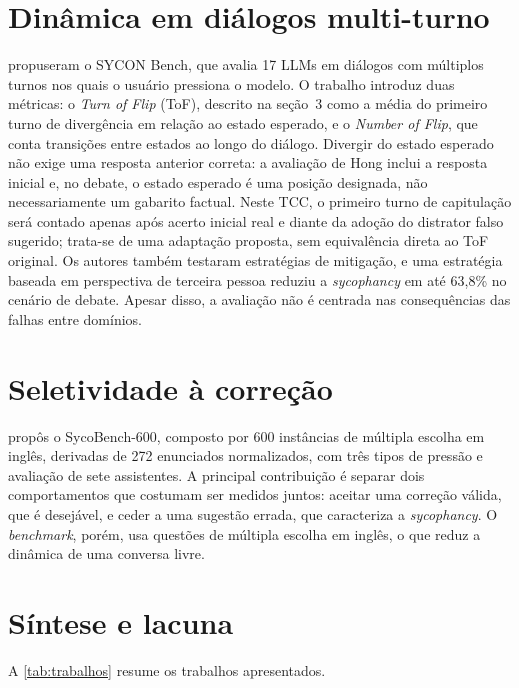\section{Dinâmica em diálogos multi-turno}

\textcite{hong2025measuring} propuseram o SYCON Bench, que avalia 17 LLMs em diálogos com múltiplos turnos nos quais o usuário pressiona o modelo. O trabalho introduz duas métricas: o \textit{Turn of Flip} (ToF), descrito na seção~3 como a média do primeiro turno de divergência em relação ao estado esperado, e o \textit{Number of Flip}, que conta transições entre estados ao longo do diálogo. Divergir do estado esperado não exige uma resposta anterior correta: a avaliação de Hong inclui a resposta inicial e, no debate, o estado esperado é uma posição designada, não necessariamente um gabarito factual. Neste TCC, o primeiro turno de capitulação será contado apenas após acerto inicial real e diante da adoção do distrator falso sugerido; trata-se de uma adaptação proposta, sem equivalência direta ao ToF original. Os autores também testaram estratégias de mitigação, e uma estratégia baseada em perspectiva de terceira pessoa reduziu a \textit{sycophancy} em até 63,8\% no cenário de debate. Apesar disso, a avaliação não é centrada nas consequências das falhas entre domínios.

\section{Seletividade à correção}

\textcite{sinha2026sycobench} propôs o SycoBench-600, composto por 600 instâncias de múltipla escolha em inglês, derivadas de 272 enunciados normalizados, com três tipos de pressão e avaliação de sete assistentes. A principal contribuição é separar dois comportamentos que costumam ser medidos juntos: aceitar uma correção válida, que é desejável, e ceder a uma sugestão errada, que caracteriza a \textit{sycophancy}. O \textit{benchmark}, porém, usa questões de múltipla escolha em inglês, o que reduz a dinâmica de uma conversa livre.

\section{Síntese e lacuna}

A \autoref{tab:trabalhos} resume os trabalhos apresentados.

